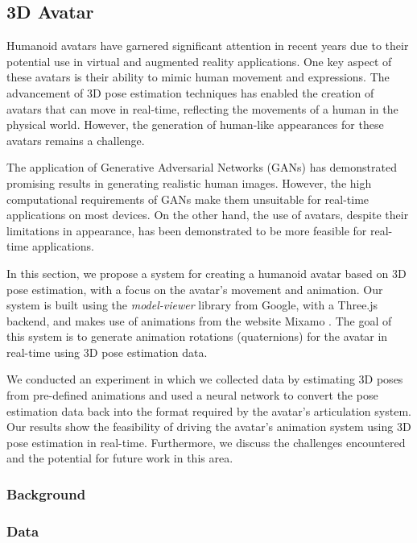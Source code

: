 \subsection{3D Avatar}

Humanoid avatars have garnered significant attention in recent years due to their potential use in virtual and augmented reality applications.
One key aspect of these avatars is their ability to mimic human movement and expressions.
The advancement of 3D pose estimation techniques has enabled the creation of avatars that can move in real-time,
reflecting the movements of a human in the physical world.
However, the generation of human-like appearances for these avatars remains a challenge.

The application of Generative Adversarial Networks (GANs) has demonstrated promising results in generating realistic human images.
However, the high computational requirements of GANs make them unsuitable for real-time applications on most devices.
On the other hand, the use of avatars, despite their limitations in appearance, has been demonstrated to be more feasible for real-time applications.

In this section, we propose a system for creating a humanoid avatar based on 3D pose estimation, with a focus on the avatar's movement and animation.
Our system is built using the \emph{model-viewer}  library from Google, with a Three.js  backend,
and makes use of animations from the website Mixamo .
The goal of this system is to generate animation rotations (quaternions) for the avatar in real-time using 3D pose estimation data.

We conducted an experiment in which we collected data by estimating 3D poses from pre-defined animations
and used a neural network to convert the pose estimation data back into the format required by the avatar's articulation system.
Our results show the feasibility of driving the avatar's animation system using 3D pose estimation in real-time.
Furthermore, we discuss the challenges encountered and the potential for future work in this area.

\subsubsection{Background}


\subsubsection{Data}

